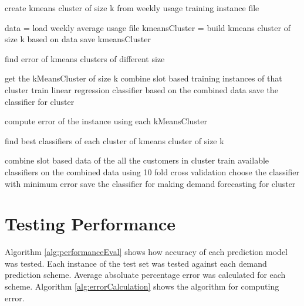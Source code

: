 
\begin{algorithm}
\caption{create kmeans cluster of size k from weekly usage training instance file}
\begin{algorithmic} [1]
\STATE data = load weekly average usage file
\STATE kmeansCluster = build kmeans cluster of size k based on data
\STATE save kmeansCluster
\end{algorithmic}
\label{alg:makeCluster}
\end{algorithm}

\begin{algorithm}[!h]
\caption{find error of kmeans clusters of different size}
\begin{algorithmic} [1]

    \STATE get the kMeansCluster of size k
        \STATE combine slot based training instances of that cluster
        \STATE train linear regression classifier based on the combined data
        \STATE save the classifier for cluster
    \ENDFOR
\ENDFOR

    \STATE compute error of the instance using each kMeansCluster
\ENDFOR
\end{algorithmic}
\label{alg:errorOfCluster}
\end{algorithm}

\begin{algorithm} [!h]
\caption{find best classifiers of each cluster of kmeans cluster of size k}
\begin{algorithmic} [1]
    \STATE combine slot based data of the all the customers in cluster
    \STATE train available classifiers on the combined data using 10 fold cross validation
    \STATE choose the classifier with minimum error
    \STATE save the classifier for making demand forecasting for cluster
\ENDFOR 
\end{algorithmic}
\label{alg:bestClassifierForCluster}
\end{algorithm}

\section{Testing Performance}
Algorithm \ref{alg:performanceEval} shows how accuracy of each prediction model was tested. Each instance of the test set was tested against each demand prediction scheme. Average absoluate percentage error was calculated for each scheme. Algorithm \ref{alg:errorCalculation} shows the algorithm for computing error.
 
